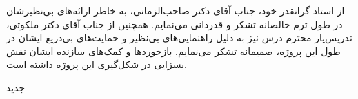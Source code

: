 


\begin{center}
\end{center}

از استاد گرانقدر خود، جناب آقای دکتر صاحب‌الزمانی، به خاطر ارائه‌های بی‌نظیرشان در طول ترم خالصانه تشکر و قدردانی می‌نمایم. همچنین از جناب آقای دکتر ملکوتی، تدریس‌یار محترم درس نیز به دلیل راهنمایی‌های بی‌نظیر و حمایت‌های بی‌دریغ ایشان در طول این پروژه، صمیمانه تشکر می‌نمایم. بازخوردها و کمک‌های سازنده ایشان نقش بسزایی در شکل‌گیری این پروژه داشته است.

‌جدید
